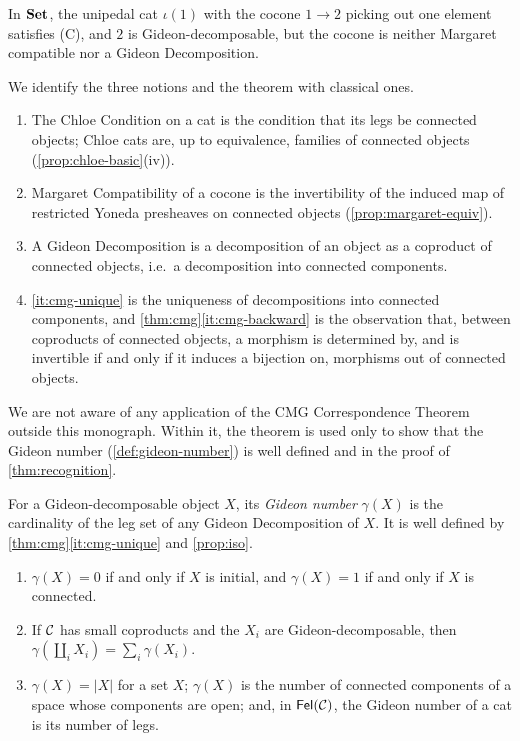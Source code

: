 \begin{counterexample}\label{cex:cmg-margaret}
In $\mathbf{Set}$, the unipedal cat $\iota(1)$ with the cocone $1\to2$ picking out one
element satisfies (C), and $2$ is Gideon-decomposable, but the cocone is
neither Margaret compatible nor a Gideon Decomposition.
\end{counterexample}

\begin{remark}\label{rem:cmg-honest}
We identify the three notions and the theorem with classical ones.
\begin{enumerate}
\item The Chloe Condition on a cat is the condition that its legs be connected
  objects; Chloe cats are, up to equivalence, families of connected objects
  (\cref{prop:chloe-basic}(iv)).
\item Margaret Compatibility of a cocone is the invertibility of the induced
  map of restricted Yoneda presheaves on connected objects
  (\cref{prop:margaret-equiv}).
\item A Gideon Decomposition is a decomposition of an object as a coproduct of
  connected objects, i.e.\ a decomposition into connected components.
\item {}\ref{it:cmg-unique} is the uniqueness of decompositions into
  connected components, and \cref{thm:cmg}\ref{it:cmg-backward} is the
  observation that, between coproducts of connected objects, a morphism is
  determined by, and is invertible if and only if it induces a bijection on,
  morphisms out of connected objects.
\end{enumerate}
We are not aware of any application of the CMG Correspondence Theorem outside
this monograph. Within it, the theorem is used only to show that the Gideon
number (\cref{def:gideon-number}) is well defined and in the proof of
\cref{thm:recognition}.
\end{remark}

\begin{definition}\label{def:gideon-number}
For a Gideon-decomposable object $X$, its \emph{Gideon number} $\gamma(X)$ is the
cardinality of the leg set of any Gideon Decomposition of $X$. It is well
defined by \cref{thm:cmg}\ref{it:cmg-unique} and \cref{prop:iso}.
\end{definition}

\begin{proposition}\label{prop:gideon-number}
\begin{enumerate}
\item $\gamma(X)=0$ if and only if $X$ is initial, and $\gamma(X)=1$ if and
  only if $X$ is connected.
\item If $\mathcal{C}$ has small coproducts and the $X_i$ are Gideon-decomposable,
  then $\gamma(\coprod_iX_i)=\sum_i\gamma(X_i)$.
\item $\gamma(X)=|X|$ for a set $X$; $\gamma(X)$ is the number of connected
  components of a space whose components are open; and, in $\mathsf{Fel}(\mathcal{C})$, the
  Gideon number of a cat is its number of legs.
\end{enumerate}
\end{proposition}

